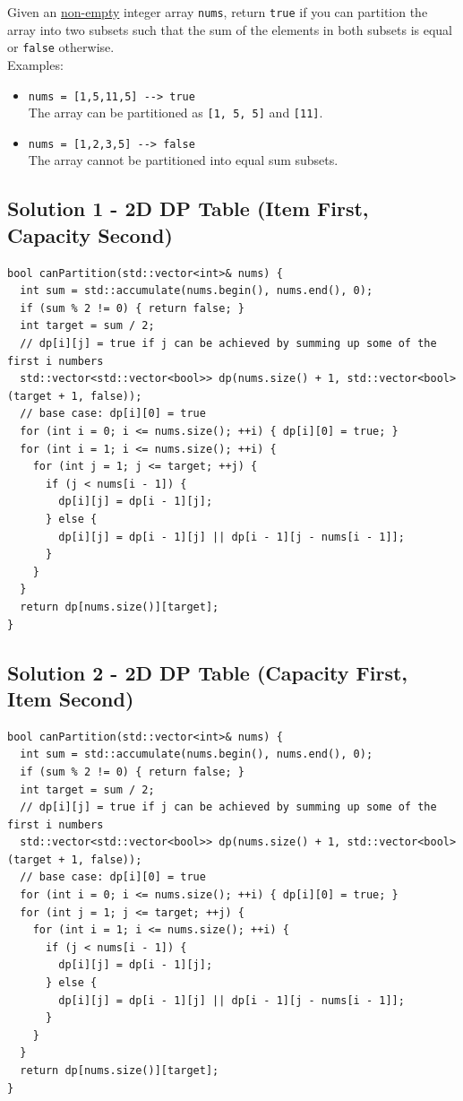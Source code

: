 Given an \ul{non-empty} integer array {\colorbox{CodeBackground}{\lstinline|nums|}}, return {\colorbox{CodeBackground}{\lstinline|true|}} if you can partition the array into two subsets such that the sum of the elements in both subsets is equal or {\colorbox{CodeBackground}{\lstinline|false|}} otherwise.\\

Examples:
\begin{itemize}
\item {\colorbox{CodeBackground}{\lstinline|nums = [1,5,11,5] --> true|}}\\
The array can be partitioned as {\colorbox{CodeBackground}{\lstinline|[1, 5, 5]|}} and {\colorbox{CodeBackground}{\lstinline|[11]|}}.
\item {\colorbox{CodeBackground}{\lstinline|nums = [1,2,3,5] --> false|}}\\
The array cannot be partitioned into equal sum subsets.
\end{itemize}

\subsection*{Solution 1 - 2D DP Table (Item First, Capacity Second)}
\begin{lstlisting}
bool canPartition(std::vector<int>& nums) {
  int sum = std::accumulate(nums.begin(), nums.end(), 0);
  if (sum % 2 != 0) { return false; }
  int target = sum / 2;
  // dp[i][j] = true if j can be achieved by summing up some of the first i numbers
  std::vector<std::vector<bool>> dp(nums.size() + 1, std::vector<bool>(target + 1, false));
  // base case: dp[i][0] = true
  for (int i = 0; i <= nums.size(); ++i) { dp[i][0] = true; }
  for (int i = 1; i <= nums.size(); ++i) {
    for (int j = 1; j <= target; ++j) {
      if (j < nums[i - 1]) {
        dp[i][j] = dp[i - 1][j];
      } else {
        dp[i][j] = dp[i - 1][j] || dp[i - 1][j - nums[i - 1]];
      }
    }
  }
  return dp[nums.size()][target];
}
\end{lstlisting}

\subsection*{Solution 2 - 2D DP Table (Capacity First, Item Second)}
\begin{lstlisting}
bool canPartition(std::vector<int>& nums) {
  int sum = std::accumulate(nums.begin(), nums.end(), 0);
  if (sum % 2 != 0) { return false; }
  int target = sum / 2;
  // dp[i][j] = true if j can be achieved by summing up some of the first i numbers
  std::vector<std::vector<bool>> dp(nums.size() + 1, std::vector<bool>(target + 1, false));
  // base case: dp[i][0] = true
  for (int i = 0; i <= nums.size(); ++i) { dp[i][0] = true; }
  for (int j = 1; j <= target; ++j) {
    for (int i = 1; i <= nums.size(); ++i) {
      if (j < nums[i - 1]) {
        dp[i][j] = dp[i - 1][j];
      } else {
        dp[i][j] = dp[i - 1][j] || dp[i - 1][j - nums[i - 1]];
      }
    }
  }
  return dp[nums.size()][target];
}
\end{lstlisting}

